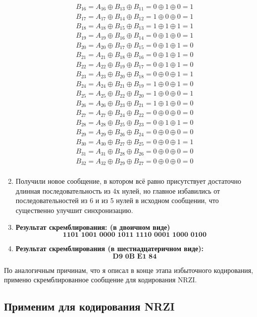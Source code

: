\begin{enumerate}
\[\begin{array}{ll}
			      B_{16} = A_{16} \oplus B_{13} \oplus B_{11} = 0 \oplus 1 \oplus 0 = 1 \\
			      B_{17} = A_{17} \oplus B_{14} \oplus B_{12} = 1 \oplus 0 \oplus 0 = 1 \\
			      B_{18} = A_{18} \oplus B_{15} \oplus B_{13} = 1 \oplus 1 \oplus 1 = 1 \\
			      B_{19} = A_{19} \oplus B_{16} \oplus B_{14} = 0 \oplus 1 \oplus 0 = 1 \\
			      B_{20} = A_{20} \oplus B_{17} \oplus B_{15} = 0 \oplus 1 \oplus 1 = 0 \\
			      B_{21} = A_{21} \oplus B_{18} \oplus B_{16} = 0 \oplus 1 \oplus 1 = 0 \\
			      B_{22} = A_{22} \oplus B_{19} \oplus B_{17} = 0 \oplus 1 \oplus 1 = 0 \\
			      B_{23} = A_{23} \oplus B_{20} \oplus B_{18} = 0 \oplus 0 \oplus 1 = 1 \\
			      B_{24} = A_{24} \oplus B_{21} \oplus B_{19} = 1 \oplus 0 \oplus 1 = 0 \\
			      B_{25} = A_{25} \oplus B_{22} \oplus B_{20} = 1 \oplus 0 \oplus 0 = 1 \\
			      B_{26} = A_{26} \oplus B_{23} \oplus B_{21} = 1 \oplus 1 \oplus 0 = 0 \\
			      B_{27} = A_{27} \oplus B_{24} \oplus B_{22} = 0 \oplus 0 \oplus 0 = 0 \\
			      B_{28} = A_{28} \oplus B_{25} \oplus B_{23} = 0 \oplus 1 \oplus 1 = 0 \\
			      B_{29} = A_{29} \oplus B_{26} \oplus B_{24} = 0 \oplus 0 \oplus 0 = 0 \\
			      B_{30} = A_{30} \oplus B_{27} \oplus B_{25} = 0 \oplus 0 \oplus 1 = 1 \\
			      B_{31} = A_{31} \oplus B_{28} \oplus B_{26} = 0 \oplus 0 \oplus 0 = 0 \\
			      B_{32} = A_{32} \oplus B_{29} \oplus B_{27} = 0 \oplus 0 \oplus 0 = 0 \\
		      \end{array}
	      \]

	\item Получили новое сообщение, в котором всё равно присутствует достаточно длинная последовательность из 4х нулей, но главное избавились от последовательностей из 6 и из 5 нулей в исходном сообщении, что существенно улучшит синхронизацию.

	\item \textbf{Результат скремблирования: (в двоичном виде)}
	      \[
		      \textbf{1101\ 1001\ 0000\ 1011\ 1110\ 0001\ 1000\ 0100}
	      \]

	\item \textbf{Результат скремблирования (в шестнадцатеричном виде):}
	      \[
		      \textbf{D9 0B E1 84}
	      \]
\end{enumerate}

По аналогичным причинам, что я описал в конце этапа избыточного кодирования, применю скремблированное сообщение для кодирования NRZI.
\subsection{Применим для кодирования NRZI}


